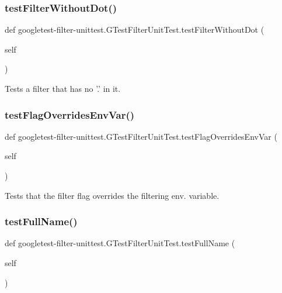 \subsubsection{\texorpdfstring{testFilterWithoutDot()}{testFilterWithoutDot()}}
{\footnotesize\ttfamily def googletest-\/filter-\/unittest.\+G\+Test\+Filter\+Unit\+Test.\+test\+Filter\+Without\+Dot (\begin{DoxyParamCaption}\item[{}]{self }\end{DoxyParamCaption})}

\begin{DoxyVerb}Tests a filter that has no '.' in it.\end{DoxyVerb}
 \mbox{\label{classgoogletest-filter-unittest_1_1_g_test_filter_unit_test_a3cfc062fbcc396bfaa94184e10e3ae39}} 
\subsubsection{\texorpdfstring{testFlagOverridesEnvVar()}{testFlagOverridesEnvVar()}}
{\footnotesize\ttfamily def googletest-\/filter-\/unittest.\+G\+Test\+Filter\+Unit\+Test.\+test\+Flag\+Overrides\+Env\+Var (\begin{DoxyParamCaption}\item[{}]{self }\end{DoxyParamCaption})}

\begin{DoxyVerb}Tests that the filter flag overrides the filtering env. variable.\end{DoxyVerb}
 \mbox{\label{classgoogletest-filter-unittest_1_1_g_test_filter_unit_test_a2fb67be78a3c92dcbae64479b220fe0f}} 
\subsubsection{\texorpdfstring{testFullName()}{testFullName()}}
{\footnotesize\ttfamily def googletest-\/filter-\/unittest.\+G\+Test\+Filter\+Unit\+Test.\+test\+Full\+Name (\begin{DoxyParamCaption}\item[{}]{self }\end{DoxyParamCaption})}

